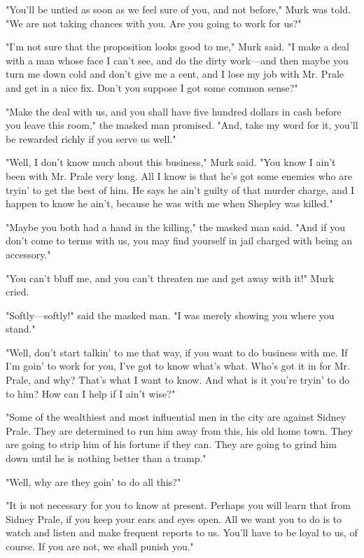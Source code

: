 \documentclass{novel}
\begin{document}
"You'll be untied as soon as we feel sure of you, and not before," Murk was told. "We are not taking chances with you. Are you going to work for us?"

"I'm not sure that the proposition looks good to me," Murk said. "I make a deal with a man whose face I can't see, and do the dirty work---and then maybe you turn me down cold and don't give me a cent, and I lose my job with Mr. Prale and get in a nice fix. Don't you suppose I got some common sense?"

"Make the deal with us, and you shall have five hundred dollars in cash before you leave this room," the masked man promised. "And, take my word for it, you'll be rewarded richly if you serve us well."

"Well, I don't know much about this business," Murk said. "You know I ain't been with Mr. Prale very long. All I know is that he's got some enemies who are tryin' to get the best of him. He says he ain't guilty of that murder charge, and I happen to know he ain't, because he was with me when Shepley was killed."

"Maybe you both had a hand in the killing," the masked man said. "And if you don't come to terms with us, you may find yourself in jail charged with being an accessory."

"You can't bluff me, and you can't threaten me and get away with it!" Murk cried.

"Softly---softly!" said the masked man. "I was merely showing you where you stand."

"Well, don't start talkin' to me that way, if you want to do business with me. If I'm goin' to work for you, I've got to know what's what. Who's got it in for Mr. Prale, and why? That's what I want to know. And what is it you're tryin' to do to him? How can I help if I ain't wise?"

"Some of the wealthiest and most influential men in the city are against Sidney Prale. They are determined to run him away from this, his old home town. They are going to strip him of his fortune if they can. They are going to grind him down until he is nothing better than a tramp."

"Well, why are they goin' to do all this?"

"It is not necessary for you to know at present. Perhaps you will learn that from Sidney Prale, if you keep your ears and eyes open. All we want you to do is to watch and listen and make frequent reports to us. You'll have to be loyal to us, of course. If you are not, we shall punish you."
\end{document}
